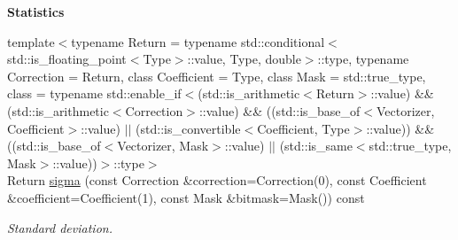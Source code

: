 \begin{Indent}{\bf Statistics}
\begin{DoxyCompactItemize}
{\footnotesize template$<$typename Return  = typename std\-::conditional$<$std\-::is\-\_\-floating\-\_\-point$<$\-Type$>$\-::value, Type, double$>$\-::type, typename Correction  = Return, class Coefficient  = Type, class Mask  = std\-::true\-\_\-type, class  = typename std\-::enable\-\_\-if$<$(std\-::is\-\_\-arithmetic$<$\-Return$>$\-::value) \&\& (std\-::is\-\_\-arithmetic$<$\-Correction$>$\-::value) \&\& ((std\-::is\-\_\-base\-\_\-of$<$\-Vectorizer, Coefficient$>$\-::value) $|$$|$ (std\-::is\-\_\-convertible$<$\-Coefficient, Type$>$\-::value)) \&\& ((std\-::is\-\_\-base\-\_\-of$<$\-Vectorizer, Mask$>$\-::value) $|$$|$ (std\-::is\-\_\-same$<$std\-::true\-\_\-type, Mask$>$\-::value))$>$\-::type$>$ }\\Return \hyperlink{classmagrathea_1_1AbstractNArray_a0e14dc15f2302a7dd49b5d559e0dece4}{sigma} (const Correction \&correction=Correction(0), const Coefficient \&coefficient=Coefficient(1), const Mask \&bitmask=Mask()) const 
\begin{DoxyCompactList}\small\item\em Standard deviation. \end{DoxyCompactList}\end{DoxyCompactItemize}
\end{Indent}
